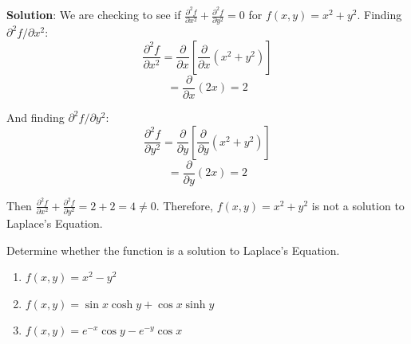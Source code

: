 \textbf{Solution}: We are checking to see if $\frac{\partial^2 f}{\partial 
x^2} + \frac{\partial^2 f}{\partial y^2} = 0$ for $f(x, y) = x^2 + y^2$. 
Finding $\partial^2 f / \partial x^2$:
$$\frac{\partial^2 f}{\partial x^2} = \frac{\partial}{\partial x} \left[ \frac{
\partial}{\partial x} \left( x^2 + y^2 \right) \right]$$
$$= \frac{\partial}{\partial x} \left( 2x \right) = 2$$

And finding $\partial^2 f / \partial y^2$:
$$\frac{\partial^2 f}{\partial y^2} = \frac{\partial}{\partial y} \left[ \frac{
\partial}{\partial y} \left( x^2 + y^2 \right) \right]$$
$$= \frac{\partial}{\partial y} \left( 2x \right) = 2$$

Then $\frac{\partial^2 f}{\partial x^2} + \frac{\partial^2 f}{\partial y^2} = 
2 + 2 = 4 \neq 0$. Therefore, $f(x, y) = x^2 + y^2$ is not a solution to 
Laplace's Equation. 

\begin{Exercise}[title = {Solutions to Laplace's Equation}, label = laplace]
Determine whether the function is a solution to Laplace's Equation. 
\begin{enumerate}
    \item $f(x, y) = x^2 - y^2$
    \item $f(x, y) = \sin{x} \cosh{y} + \cos{x} \sinh{y}$
    \item $f(x, y) = e^{-x} \cos{y} - e^{-y} \cos{x}$
\end{enumerate}
\vspace{50mm}
\end{Exercise}

